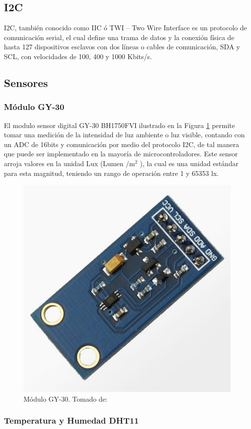 \subsection{I2C}

I2C, también conocido como IIC ó TWI – Two Wire Interface es un protocolo de comunicación serial, el cual define una trama de datos y la conexión física de hasta 127 dispositivos esclavos con dos líneas o cables de comunicación, SDA y SCL, con velocidades de 100, 400 y 1000 Kbits/s. \cite{I2C} \\

\subsection{Sensores}\label{sec:sensors}

\subsubsection{Módulo GY-30}

El modulo sensor digital GY-30 BH1750FVI ilustrado en la Figura \ref{fig:gy-30} permite tomar una medición de la intensidad de luz ambiente o luz visible, contando con un ADC de 16bits y comunicación por medio del protocolo I2C, de tal manera que puede ser implementado en la mayoría de microcontroladores. Este sensor arroja valores en la unidad Lux (Lumen /m$^2$ ), la cual es una unidad estándar para esta magnitud, teniendo un rango de operación entre 1 y 65353 lx.\cite{GY30}\\

\begin{figure}[H]
	\centering
	\caption[Módulo GY-30.]{Módulo GY-30. Tomado de: \cite{GY30}}
	\label{fig:gy-30}
	\includegraphics[width=0.4\linewidth]{Imagenes/gy-30}
\end{figure}

\subsubsection{Temperatura y Humedad DHT11}

